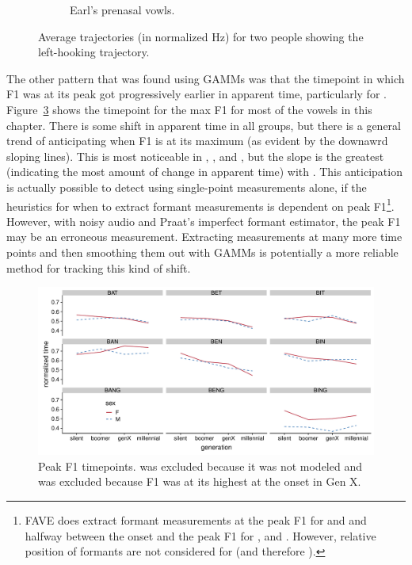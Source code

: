 \begin{figure}[tb!]
\begin{subfigure}[t]{2.925in}
        \caption{Earl's prenasal vowls.}
        \label{fig:earl_prenasal}
    \end{subfigure}
    \hspace{\fill}
    \caption{Average trajectories (in normalized Hz) for two people showing the left-hooking \ben trajectory.}
    \label{fig:marilyn_and_earl}
\end{figure}



The other pattern that was found using GAMMs was that the timepoint in which F1 was at its peak got progressively earlier in apparent time, particularly for \ben. Figure~\ref{fig:change_in_nucleus} shows the timepoint for the max F1 for most of the vowels in this chapter. There is some shift in apparent time in all groups, but there is a general trend of anticipating when F1 is at its maximum (as evident by the downawrd sloping lines). This is most noticeable in  \bet, \ben, and \bin, but the slope is the greatest (indicating the most amount of change in apparent time) with \ben. This anticipation is actually possible to detect using single-point measurements alone, if the heuristics for when to extract formant measurements is dependent on peak F1\footnote{FAVE does extract formant measurements at the peak F1 for \face and \price and halfway between the onset and the peak F1 for \goat, and \mouth\citep[35]{labov_etal_2013}. However, relative position of formants are not considered for \dress (and therefore \ben).}. However, with noisy audio and Praat's imperfect formant estimator, the peak F1 may be an erroneous measurement. Extracting measurements at many more time points and then smoothing them out with GAMMs is potentially a more reliable method for tracking this kind of shift.

\begin{figure}[tb!]
    \centering
    \includegraphics[width = 6.5in]{Figures/other_figures/change_in_nucleus.pdf}
    \caption[Peak F1 timepoints]{Peak F1 timepoints. \beng was excluded because it was not modeled and \bang was excluded because F1 was at its highest at the onset in Gen X.}
    \label{fig:change_in_nucleus}
\end{figure}

